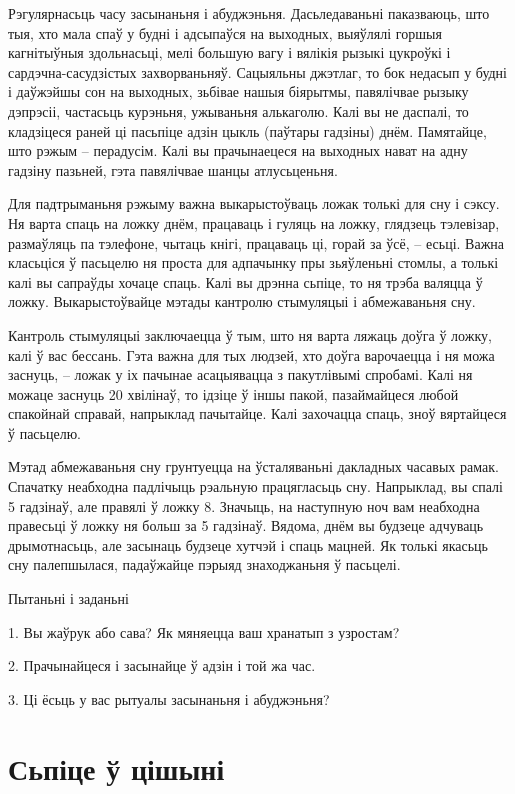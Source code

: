 Рэгулярнасьць часу засынаньня і абуджэньня. Дасьледаваньні паказваюць, што тыя, хто мала спаў у будні і адсыпаўся на выходных, выяўлялі горшыя кагнітыўныя здольнасьці, мелі большую вагу і вялікія рызыкі цукроўкі і сардэчна-сасудзістых захворваньняў. Сацыяльны джэтлаг, то бок недасып у будні і даўжэйшы сон на выходных, зьбівае нашыя біярытмы, павялічвае рызыку дэпрэсіі, частасьць курэньня, ужываньня алькаголю. Калі вы не даспалі, то кладзіцеся раней ці пасьпіце адзін цыкль (паўтары гадзіны) днём. Памятайце, што рэжым – перадусім. Калі вы прачынаецеся на выходных нават на адну гадзіну пазьней, гэта павялічвае шанцы атлусьценьня.

Для падтрыманьня рэжыму важна выкарыстоўваць ложак толькі для сну і сэксу. Ня варта спаць на ложку днём, працаваць і гуляць на ложку, глядзець тэлевізар, размаўляць па тэлефоне, чытаць кнігі, працаваць ці, горай за ўсё, – есьці. Важна класьціся ў пасьцелю ня проста для адпачынку пры зьяўленьні стомлы, а толькі калі вы сапраўды хочаце спаць. Калі вы дрэнна сьпіце, то ня трэба валяцца ў ложку. Выкарыстоўвайце мэтады кантролю стымуляцыі і абмежаваньня сну.

Кантроль стымуляцыі заключаецца ў тым, што ня варта ляжаць доўга ў ложку, калі ў вас бессань. Гэта важна для тых людзей, хто доўга варочаецца і ня можа заснуць, – ложак у іх пачынае асацыявацца з пакутлівымі спробамі. Калі ня можаце заснуць 20 хвілінаў, то ідзіце ў іншы пакой, пазаймайцеся любой спакойнай справай, напрыклад пачытайце. Калі захочацца спаць, зноў вяртайцеся ў пасьцелю.

Мэтад абмежаваньня сну грунтуецца на ўсталяваньні дакладных часавых рамак. Спачатку неабходна падлічыць рэальную працягласьць сну. Напрыклад, вы спалі 5 гадзінаў, але правялі ў ложку 8. Значыць, на наступную ноч вам неабходна правесьці ў ложку ня больш за 5 гадзінаў. Вядома, днём вы будзеце адчуваць дрымотнасьць, але засынаць будзеце хутчэй і спаць мацней. Як толькі якасьць сну палепшылася, падаўжайце пэрыяд знаходжаньня ў пасьцелі.

Пытаньні і заданьні

1. Вы жаўрук або сава? Як мяняецца ваш хранатып з узростам?

2. Прачынайцеся і засынайце ў адзін і той жа час.

3. Ці ёсьць у вас рытуалы засынаньня і абуджэньня?


\section{Сьпіце ў цішыні}

